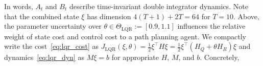\documentclass[letterpaper, 10 pt, conference]{ieeeconf}
\newcommand{\?}{\stackrel{?}{=}}
\newcommand{\objLQR}{J_{\mathrm{LQR}}}
\newcommand{\param}{\theta}
\newcommand{\paramSetLQR}{\Theta_{\mathrm{LQR}}}
\newcommand{\var}{\xi}
\newcommand{\LQRHorizon}{T}
\newcommand{\LQRIterate}{t}
\newcommand{\LQRStateCost}{Q}
\newcommand{\LQRControlCost}{R}
\newcommand{\LQRStateDyn}{A}
\newcommand{\LQRControlDyn}{B}
\newcommand{\frank}[1]{{\textcolor[rgb]{0,0,1}{\textsf{[Frank: {#1}]}}}}
\newcommand{\antoine}[1]{{\textcolor[rgb]{1,0,0}{\textsf{[Antoine: {#1}]}}}}
\begin{document}
In words, $\LQRStateDyn_\LQRIterate$ and $\LQRControlDyn_\LQRIterate$ describe time-invariant double integrator dynamics.
Note that the combined state $\var$ has dimension $4(\LQRHorizon + 1) + 2\LQRHorizon = 64$ for $T=10$.
Above, the parameter uncertainty over $\param \in \paramSetLQR := [0.9, 1.1]$ influences the relative weight of state cost and control cost to 
a path planning agent.
We compactly write the cost~\eqref{eq:lqr_cost} as $\objLQR(\var, \param) = \frac{1}{2} \var^\top H \var = \frac{1}{2} \var^\top (H_\LQRStateCost + \param H_\LQRControlCost) \var$ and dynamics~\eqref{eq:lqr_dyn} as $M \var = b$ for appropriate $H$, $M$, and $b$. 
Concretely,
\end{document}
